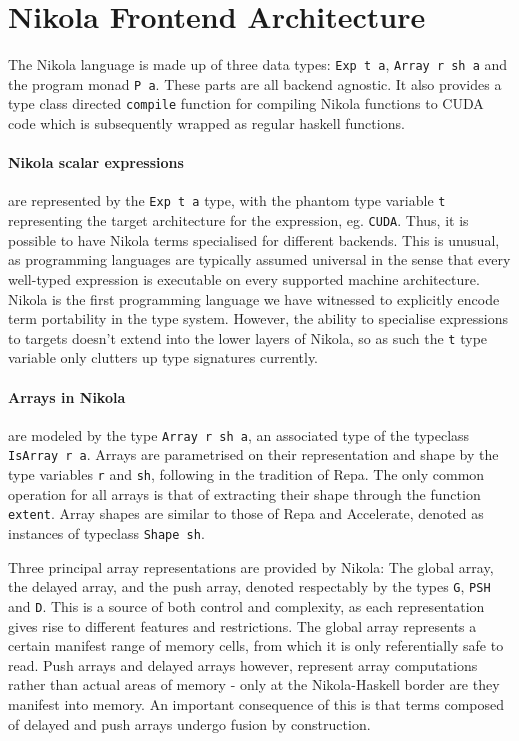 \section{Nikola Frontend Architecture}


The Nikola language is made up of three data types: \texttt{Exp t a},
\texttt{Array r sh a} and the program monad \texttt{P a}. These parts are all
backend agnostic. It also provides a type class directed \texttt{compile}
function for compiling Nikola functions to CUDA code which is subsequently
wrapped as regular haskell functions.

\paragraph{Nikola scalar expressions} are represented by the \texttt{Exp t a} type, with
the phantom type variable \texttt{t} representing the target architecture for
the expression, eg.  \texttt{CUDA}. Thus, it is possible to have Nikola terms
specialised for different backends. This is unusual, as programming languages
are typically assumed universal in the sense that every well-typed expression
is executable on every supported machine architecture. Nikola is the first
programming language we have witnessed to explicitly encode term portability in
the type system. However, the ability to specialise expressions to targets
doesn't extend into the lower layers of Nikola, so as such the \texttt{t} type
variable only clutters up type signatures currently.

\paragraph{Arrays in Nikola} are modeled by the type \texttt{Array r sh a}, an associated
type of the typeclass \texttt{IsArray r a}. Arrays are parametrised on their
representation and shape by the type variables \texttt{r} and \texttt{sh},
following in the tradition of Repa. The only common operation for all arrays is
that of extracting their shape through the function \texttt{extent}. Array
shapes are similar to those of Repa and Accelerate, denoted as instances of
typeclass \texttt{Shape sh}.

Three principal array representations are provided by Nikola: The global array,
the delayed array, and the push array, denoted respectably by the types
\texttt{G}, \texttt{PSH} and \texttt{D}. This is a source of both control and
complexity, as each representation gives rise to different features and
restrictions. The global array represents a certain manifest range of memory
cells, from which it is only referentially safe to read. Push arrays and
delayed arrays however, represent array computations rather than actual areas
of memory - only at the Nikola-Haskell border are they manifest into memory. An
important consequence of this is that terms composed of delayed and push arrays
undergo fusion by construction.

